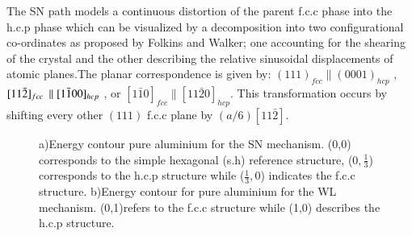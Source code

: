 \documentclass[preprint]{elsarticle}
\begin{document}
The SN path models a continuous distortion of the parent f.c.c phase into the h.c.p phase which can be visualized by a decomposition into two configurational 
co-ordinates as proposed by Folkins and Walker\cite{folkins1990configuration}; one accounting for the shearing of the crystal and the other describing the relative 
sinusoidal displacements of atomic planes.The  planar correspondence is given by: $ (1 1 1)_{fcc} \parallel (0 0 0 1)_{hcp}$ , $ [1 1\bar2]_{fcc} \hspace{0.2em} 
\parallel [1\bar1 0 0]_{hcp}$ , or $ [1 \bar1 0]_{fcc} \parallel [1 1 \bar2 0]_{hcp}$.
This transformation occurs by shifting every other $ (1 1 1)$ f.c.c plane by $(a/6)[1 1\bar2]$.
 \begin{figure}[ht]
   \centering
\caption{a)Energy contour pure aluminium for the SN mechanism. (0,0) corresponds to the simple hexagonal (s.h) reference structure, ($0,\frac{1}{3}$) corresponds to the h.c.p structure while ($\frac{1}{3},0$) indicates the f.c.c structure. b)Energy contour for pure aluminium for the WL mechanism. (0,1)refers to the f.c.c structure while (1,0) describes the h.c.p 
structure.}
 \end{figure}
\end{document}
